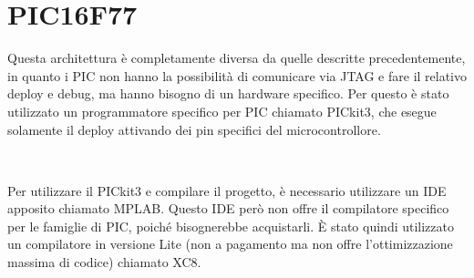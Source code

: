 \documentclass[a4paper,titlepage]{book}
\begin{document}
\section{PIC16F77}

Questa architettura è completamente diversa da quelle descritte precedentemente, in quanto i PIC non hanno la possibilità di comunicare via JTAG e fare il relativo deploy e debug, ma hanno bisogno di un hardware specifico. Per questo è stato utilizzato un programmatore specifico per PIC chiamato PICkit3, che esegue solamente il deploy attivando dei pin specifici del microcontrollore.

~

Per utilizzare il PICkit3 e compilare il progetto, è necessario utilizzare un IDE apposito chiamato MPLAB. Questo IDE però non offre il compilatore specifico per le famiglie di PIC, poiché bisognerebbe acquistarli. È stato quindi utilizzato un compilatore in versione Lite (non a pagamento ma non offre l'ottimizzazione massima di codice) chiamato XC8. 



\nocite{*}
 

\end{document}
